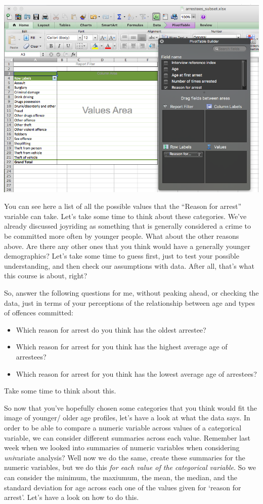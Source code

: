 \documentclass[]{book}
\providecommand{\tightlist}{%
  \setlength{\itemsep}{0pt}\setlength{\parskip}{0pt}}
\theoremstyle{definition}
\theoremstyle{definition}
\theoremstyle{definition}
\theoremstyle{remark}
\begin{document}
\includegraphics{imgs/reason_arr_values.png}

You can see here a list of all the possible values that the ``Reason for
arrest'' variable can take. Let's take some time to think about these
categories. We've already discussed joyriding as something that is
generally considered a crime to be committed more often by younger
people. What about the other reasons above. Are there any other ones
that you think would have a generally younger demographics? Let's take
some time to guess first, just to test your possible understanding, and
then check our assumptions with data. After all, that's what this course
is about, right?

So, answer the following questions for me, without peaking ahead, or
checking the data, just in terms of your perceptions of the relationship
between age and types of offences committed:

\begin{itemize}
\tightlist
\item
  Which reason for arrest do you think has the oldest arrestee?
\item
  Which reason for arrest for you think has the highest average age of
  arrestees?
\item
  Which reason for arrest for you think has the lowest average age of
  arrestees?
\end{itemize}

Take some time to think about this.

So now that you've hopefully chosen some categories that you think would
fit the image of younger/ older age profiles, let's have a look at what
the data says. In order to be able to compare a numeric variable across
values of a categorical variable, we can consider different summaries
across each value. Remember last week when we looked into summaries of
numeric variables when considering \emph{uni}variate analysis? Well now
we do the same, create these summaries for the numeric variables, but we
do this \emph{for each value of the categorical variable}. So we can
consider the minimum, the maxiumum, the mean, the median, and the
standard deviation for age across each one of the values given for
`reason for arrest'. Let's have a look on how to do this.
\end{document}
